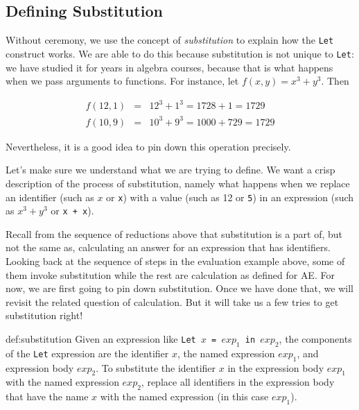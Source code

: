 \documentclass{book}
\renewcommand{\ae}{\textsc{AE}\xspace}
\renewcommand{\emph}[1]{{\color{blue}\textit{#1}}}
\begin{document}
\subsection{Defining Substitution}

Without ceremony, we use the concept of 
\emph{substitution} to explain how the 
\texttt{Let} construct works. We are able to do 
this because substitution is not unique to 
\texttt{Let}: we have studied it for years 
in algebra courses, because that is what 
happens when we pass arguments to 
functions. For instance, let 
$f(x,y) = x^3 + y^3$. Then 

\begin{eqnarray*}
f(12,1) & = & 12^3 + 1^3 = 1728 + 1 = 1729 \\ 
f(10,9) & = & 10^3 + 9^3 = 1000 + 729 = 1729   
\end{eqnarray*} 

Nevertheless, it is a good idea to pin down 
this operation precisely. 

Let's make sure we understand what we are trying 
to define. We want a crisp description of the 
process of substitution, namely what happens when 
we replace an identifier (such as $x$ or \texttt{x}) with 
a value (such as 12 or \texttt{5}) in an expression 
(such as $x^3 + y^3$ or \texttt{x + x}). 

Recall from the sequence of reductions above that 
substitution is a part of, but not the 
same as, calculating an answer for an expression 
that has identifiers. Looking back at the 
sequence of steps in the 
evaluation example above, some of them invoke substitution 
while the rest are calculation as defined for \ae. 
For now, we are first going to pin down substitution. 
Once we have done that, we will revisit the related 
question of calculation. But it will take us a few tries 
to get substitution right! 

\begin{mydef}[Substitution]{def:substitution}
Given an expression like \texttt{Let $x$ = $exp_1$ in $exp_2$},
the components of the \texttt{Let} expression are the 
identifier \texttt{$x$}, the named expression \texttt{$exp_1$}, 
and expression body \texttt{$exp_2$}. To substitute 
the identifier \texttt{$x$} in the expression body \texttt{$exp_1$} 
with the named expression \texttt{$exp_2$}, replace all identifiers 
in the expression body that have the name \texttt{$x$} with the 
named expression (in this case \texttt{$exp_1$}). 
\end{mydef}
\end{document}
